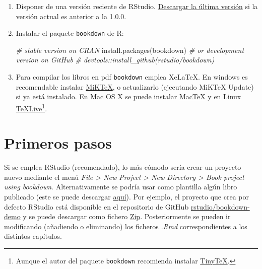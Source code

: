 \documentclass[
]{book}
\newenvironment{Shaded}{\begin{snugshade}}{\end{snugshade}}
\newcommand{\CommentTok}[1]{\textcolor[rgb]{0.56,0.35,0.01}{\textit{#1}}}
\newcommand{\FunctionTok}[1]{\textcolor[rgb]{0.00,0.00,0.00}{#1}}
\newcommand{\NormalTok}[1]{#1}
\newcommand{\StringTok}[1]{\textcolor[rgb]{0.31,0.60,0.02}{#1}}
\theoremstyle{definition}
\theoremstyle{definition}
\theoremstyle{definition}
\theoremstyle{definition}
\theoremstyle{remark}
\begin{document}
\begin{enumerate}
\def\labelenumi{\arabic{enumi}.}
\item
  Disponer de una versión reciente de RStudio. \href{https://www.rstudio.com/products/rstudio/download/}{Descargar la última versión} si la versión actual es anterior a la 1.0.0.
\item
  Instalar el paquete \texttt{bookdown} de R:

\begin{Shaded}
\begin{Highlighting}[]
\CommentTok{\# stable version on CRAN}
\FunctionTok{install.packages}\NormalTok{(}\StringTok{\textquotesingle{}bookdown\textquotesingle{}}\NormalTok{)}
\CommentTok{\# or development version on GitHub}
\CommentTok{\# devtools::install\_github(\textquotesingle{}rstudio/bookdown\textquotesingle{})}
\end{Highlighting}
\end{Shaded}
\item
  Para compilar los libros en pdf \texttt{bookdown} emplea XeLaTeX. En windows es recomendable instalar \href{https://miktex.org/download}{MiKTeX}, o actualizarlo (ejecutando MiKTeX Update) si ya está instalado. En Mac OS X se puede instalar \href{http://www.tug.org/mactex/}{MacTeX} y en Linux \href{http://www.tug.org/texlive}{TeXLive}\footnote{Aunque el autor del paquete \texttt{bookdown} recomienda instalar \href{https://yihui.name/tinytex}{TinyTeX}.}.
\end{enumerate}

\hypertarget{primeros-pasos}{%
\section{Primeros pasos}\label{primeros-pasos}}

Si se emplea RStudio (recomendado), lo más cómodo sería crear un proyecto nuevo
mediante el menú \emph{File \textgreater{} New Project \textgreater{} New Directory \textgreater{} Book project using bookdown}.
Alternativamente se podría usar como plantilla algún libro publicado
(este se puede descargar \href{https://github.com/rubenfcasal/bookdown_intro/archive/master.zip}{aquí}).
Por ejemplo, el proyecto que crea por defecto RStudio está disponible en el repositorio de GitHub \href{https://github.com/rstudio/bookdown-demo}{rstudio/bookdown-demo} y se puede descargar como fichero
\href{https://github.com/rstudio/bookdown-demo/archive/master.zip}{Zip}.
Posteriormente se pueden ir modificando (añadiendo o eliminando) los ficheros
\emph{.Rmd} correspondientes a los distintos capítulos.
\end{document}
